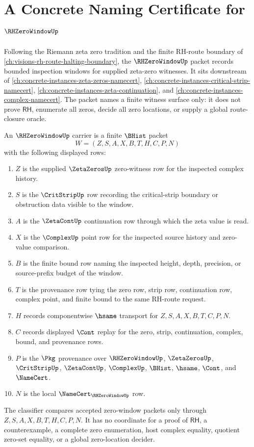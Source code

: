 \chapter{A Concrete Naming Certificate for $\RHZeroWindowUp$}
\label{ch:concrete-instances-rh-zero-window-namecert}

Following the Riemann zeta zero tradition and the finite RH-route boundary
of \autoref{ch:visions-rh-route-halting-boundary}, the $\RHZeroWindowUp$
packet records bounded inspection windows for supplied zeta-zero witnesses.
It sits downstream of \autoref{ch:concrete-instances-zeta-zeros-namecert},
\autoref{ch:concrete-instances-critical-strip-namecert},
\autoref{ch:concrete-instances-zeta-continuation}, and
\autoref{ch:concrete-instances-complex-namecert}. The packet names a finite
witness surface only: it does not prove $\mathsf{RH}$, enumerate all zeros,
decide all zero locations, or supply a global route-closure oracle.

\begin{definition}
\label{def:rh-zero-window-carrier}
An $\RHZeroWindowUp$ carrier is a finite $\BHist$ packet
$$
W=(Z,S,A,X,B,T,H,C,P,N)
$$
with the following displayed rows:
\begin{enumerate}
\item $Z$ is the supplied $\ZetaZerosUp$ zero-witness row for the inspected
  complex history.
\item $S$ is the $\CritStripUp$ row recording the critical-strip boundary
  or obstruction data visible to the window.
\item $A$ is the $\ZetaContUp$ continuation row through which the zeta value
  is read.
\item $X$ is the $\ComplexUp$ point row for the inspected source history and
  zero-value comparison.
\item $B$ is the finite bound row naming the inspected height, depth,
  precision, or source-prefix budget of the window.
\item $T$ is the provenance row tying the zero row, strip row, continuation
  row, complex point, and finite bound to the same RH-route request.
\item $H$ records componentwise $\hsame$ transport for $Z,S,A,X,B,T,C,P,N$.
\item $C$ records displayed $\Cont$ replay for the zero, strip,
  continuation, complex, bound, and provenance rows.
\item $P$ is the $\Pkg$ provenance over $\RHZeroWindowUp$, $\ZetaZerosUp$,
  $\CritStripUp$, $\ZetaContUp$, $\ComplexUp$, $\BHist$, $\hsame$, $\Cont$,
  and $\NameCert$.
\item $N$ is the local $\NameCert_{\RHZeroWindowUp}$ row.
\end{enumerate}
The classifier compares accepted zero-window packets only through
$Z,S,A,X,B,T,H,C,P,N$. It has no coordinate for a proof of $\mathsf{RH}$, a
counterexample, a complete zero enumeration, host complex equality, quotient
zero-set equality, or a global zero-location decider.
\end{definition}

